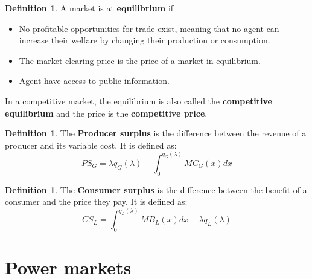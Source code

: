 \documentclass[12pt, openany]{report}
\theoremstyle{definition}
\newtheorem{definition}[thm]{Definition}
\begin{document}
\begin{definition}
    A market is at \textbf{equilibrium} if 
    \begin{itemize}
        \item No profitable opportunities for trade exist, meaning that no agent can increase their welfare by changing their production or consumption.
        \item The market clearing price is the price of a market in equilibrium.
        \item Agent have access to public information.
    \end{itemize}
    In a competitive market, the equilibrium is also called the \textbf{competitive equilibrium} and the price is the \textbf{competitive price}.
\end{definition}
\begin{definition}
    The \textbf{Producer surplus} is the difference between the revenue of a producer and its variable cost. It is defined as:
    \begin{equation}
    PS_G =  \lambda  q_G(\lambda)- \int_{0}^{q_G(\lambda)} MC_G(x)dx
    \end{equation}
\end{definition}
\begin{definition}
    The \textbf{Consumer surplus} is the difference between the benefit of a consumer and the price they pay. It is defined as:
    \begin{equation}
    CS_L =  \int_{0}^{q_L(\lambda)} MB_L(x)dx - \lambda q_L(\lambda)
    \end{equation}
\end{definition}
\chapter{Power markets}
\end{document}
